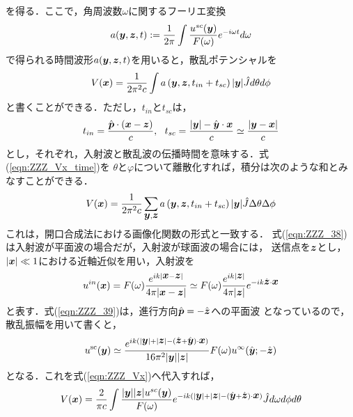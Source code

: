 を得る．ここで，角周波数$\omega$に関するフーリエ変換
\begin{equation}
	a(\mbox{\boldmath $y$},\mbox{\boldmath $z$},t):=\frac{1}{2\pi} \int \frac{u^{sc}(\mbox{\boldmath $y$})}{F(\omega)}e^{-i\omega t}d\omega
	\label{eqn:ZZZ_36}
\end{equation}
で得られる時間波形$a(\mbox{\boldmath $y$},\mbox{\boldmath $z$},t)$を用いると，散乱ポテンシャルを
\begin{equation}
	V(\mbox{\boldmath $x$}) =\frac{1}{2\pi^2c} \int a\left(\mbox{\boldmath $y$}, \mbox{\boldmath $z$}, t_{in}+t_{sc} \right) |\mbox{\boldmath $y$}| \hat{J} d\theta d\phi
	\label{eqn:ZZZ_Vx_time}
\end{equation}
と書くことができる．ただし，$t_{in}$と$t_{sc}$は，
\begin{equation}
	t_{in}=\frac{\hat{\fat{p}}\cdot \left( \fat{x}-\fat{z}\right)}{c}, \ \ 
	t_{sc}=
	\frac{ |\fat{y}|-\hat{\fat{y}}\cdot \fat{x} }{c} \simeq 
	\frac{\left|\fat{y}-\fat{x}\right|}{c} 
	\label{eqn:ZZZ_37}
\end{equation}
とし，それぞれ，入射波と散乱波の伝播時間を意味する．式(\ref{eqn:ZZZ_Vx_time})を
$\theta$と$\varphi$について離散化すれば，積分は次のような和とみなすことができる．
\begin{equation}
	V(\mbox{\boldmath $x$}) = 
	\frac{1}{2\pi^2c} 
	\sum_{\mbox{\boldmath $y$},\mbox{\boldmath $z$}} 
	a\left(\mbox{\boldmath $y$}, \mbox{\boldmath $z$}, t_{in}+t_{sc} \right) 
	|\mbox{\boldmath $y$}| \hat{J} \Delta \theta \Delta \phi
	\label{eqn:ZZZ_38}
\end{equation}
これは，開口合成法における画像化関数の形式と一致する．
式(\ref{eqn:ZZZ_38})は入射波が平面波の場合だが，入射波が球面波の場合には，
送信点を$\mbox{\boldmath $z$}$とし，$|\mbox{\boldmath $x$}|\ll 1$における近軸近似を用い，入射波を
\begin{equation}
	u^{in}(\mbox{\boldmath $x$})
	=F(\omega)\frac{e^{ik|\mbox{\boldmath $x$}-\mbox{\boldmath $z$}|}}{4\pi |\mbox{\boldmath $x$}-\mbox{\boldmath $z$}|}
	\simeq 
	F(\omega)
	\frac{e^{ik|\mbox{\boldmath $z$}|}}{4\pi |\mbox{\boldmath $z$}|}
	e^{-ik\hat{\mbox{\boldmath $z$}}\cdot\mbox{\boldmath $x$}}
	\label{eqn:ZZZ_39}
\end{equation}
と表す．式(\ref{eqn:ZZZ_39})は，進行方向$\hat{\mbox{\boldmath $p$}}=-\hat{\mbox{\boldmath $z$}}$への平面波
となっているので，散乱振幅を用いて書くと，
\begin{equation}
	u^{\rm sc}(\mbox{\boldmath $y$}) \simeq  
	\frac{e^{ik(|\mbox{\boldmath $y$}|+|\mbox{\boldmath $z$}|-(\hat{\mbox{\boldmath $z$}}+\hat{\mbox{\boldmath $y$}})\cdot \mbox{\boldmath $x$})}}{16\pi^2 |\mbox{\boldmath $y$}| |\mbox{\boldmath $z$}|}
	F(\omega)
	u^{\infty}(\hat{\mbox{\boldmath $y$}};-\hat{\mbox{\boldmath $z$}}) 
	\label{eqn:ZZZ_usc_far}
\end{equation}
となる．これを式(\ref{eqn:ZZZ_Vx})へ代入すれば，
\begin{equation}
	V(\mbox{\boldmath $x$}) =\frac{2}{\pi c} \int \frac{|\mbox{\boldmath $y$}||\mbox{\boldmath $z$}|u^{sc}(\mbox{\boldmath $y$})}{F(\omega)}
	e^{-ik(|\mbox{\boldmath $y$}|+|\mbox{\boldmath $z$}|-(\hat{\mbox{\boldmath $y$}}+\hat{\mbox{\boldmath $z$}})\cdot\mbox{\boldmath $x$}) }
	\hat{J} d\omega d\phi d\theta	
	\label{eqn:ZZZ_39}
\end{equation}
